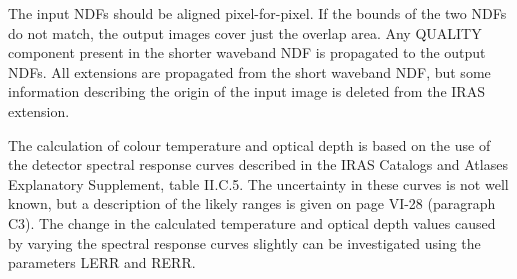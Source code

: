 \begin{small}
{{      The input NDFs should be aligned pixel-for-pixel. If the bounds
      of the two NDFs do not match, the output images cover just the
      overlap area. Any QUALITY component present in the shorter
      waveband NDF is propagated to the output NDFs. All extensions are
      propagated from the short waveband NDF, but some information
      describing the origin of the input image is deleted from the
      IRAS extension.

      The calculation of colour temperature and optical depth is based
      on the use of the detector spectral response curves described in
      the IRAS Catalogs and Atlases Explanatory Supplement, table
      II.C.5. The uncertainty in these curves is not well known, but a
      description of the likely ranges is given on page VI-28
      (paragraph C3). The change in the calculated temperature and
      optical depth values caused by varying the spectral response
      curves slightly can be investigated using the parameters LERR and
      RERR.

}}
\end{small}
